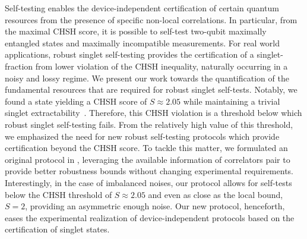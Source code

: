 Self-testing enables the device-independent certification of certain quantum resources from the presence of specific non-local correlations.
In particular, from the maximal CHSH score, it is possible to self-test two-qubit maximally entangled states and maximally incompatible measurements.
For real world applications, robust singlet self-testing provides the certification of a singlet-fraction from lower violation of the CHSH inequality, naturally occurring in a noisy and lossy regime. 
We present our work towards the quantification of the fundamental resources that are required for robust singlet self-tests.
Notably, we found a state yielding a CHSH score of $S\approx2.05$ while maintaining a trivial singlet extractability~\cite{Valcarce2020}.
Therefore, this CHSH violation is a threshold below which robust singlet self-testing fails.
From the relatively high value of this threshold, we emphasized the need for new robust self-testing protocols which provide certification beyond the CHSH score.
To tackle this matter, we formulated an original protocol in \cite{Valcarce2022}, leveraging the available information of correlators pair to provide better robustness bounds without changing experimental requirements.
Interestingly, in the case of imbalanced noises, our protocol allows for self-tests below the CHSH threshold of $S\approx 2.05$ and even as close as the local bound, $S=2$, providing an asymmetric enough noise. 
Our new protocol, henceforth, eases the experimental realization of device-independent protocols based on the certification of singlet states.



